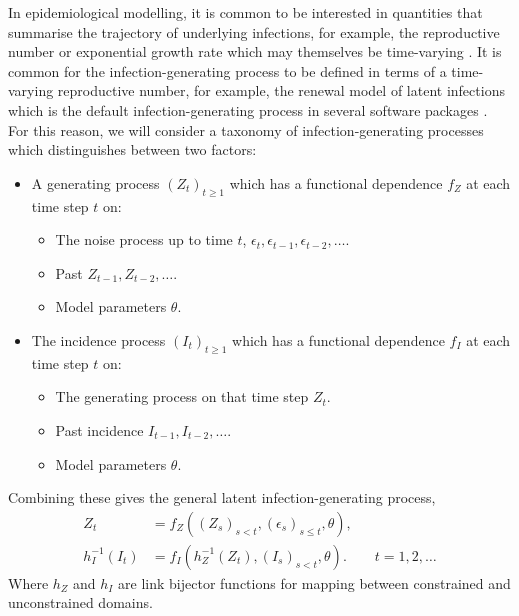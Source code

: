 \documentclass{getwriting}
\begin{document}
In epidemiological modelling, it is common to be interested in quantities that summarise the trajectory of underlying infections, for example, the reproductive number \cite{anderson1991infectious,diekmann1990definition,keeling2011modeling} or exponential growth rate \cite{anderson1991infectious,keeling2011modeling} which may themselves be time-varying \cite{gostic2020practical}. It is common for the infection-generating process to be defined in terms of a time-varying reproductive number, for example, the renewal model of latent infections \cite{mishra_derivation_2020} which is the default infection-generating process in several software packages \cite{abbott2020epinow2,scott2021epidemia, Cori2022}. For this reason, we will consider a taxonomy of infection-generating processes which distinguishes between two factors: 
\begin{itemize}
    \item A generating process $(Z_t)_{t\geq 1}$ which has a functional dependence $f_Z$ at each time step $t$ on:
    \begin{itemize}
        \item The noise process up to time $t$, $\epsilon_{t},\epsilon_{t-1},\epsilon_{t-2},\dots$.
        \item Past $Z_{t-1},Z_{t-2},\dots$.
        \item Model parameters $\theta$.
    \end{itemize}
    \item The incidence process $(I_t)_{t\geq 1}$ which has a functional dependence $f_I$ at each time step $t$ on:
    \begin{itemize}
        \item The generating process on that time step $Z_t$.
        \item Past incidence $I_{t-1},I_{t-2},\dots$.
        \item Model parameters $\theta$.
    \end{itemize}
\end{itemize}
Combining these gives the general latent infection-generating process,
\begin{equation} \label{eq:gen_igp}
\begin{split}
Z_t &= f_Z((Z_s)_{s < t}, (\epsilon_{s})_{s\leq t}, \theta),\\
h_{I}^{-1}(I_t) &= f_I(h^{-1}_Z(Z_t), (I_s)_{s < t}, \theta). \qquad t = 1, 2 , \dots
\end{split}
\end{equation}
Where $h_Z$ and $h_I$ are link bijector functions for mapping between constrained and unconstrained domains.
\end{document}
